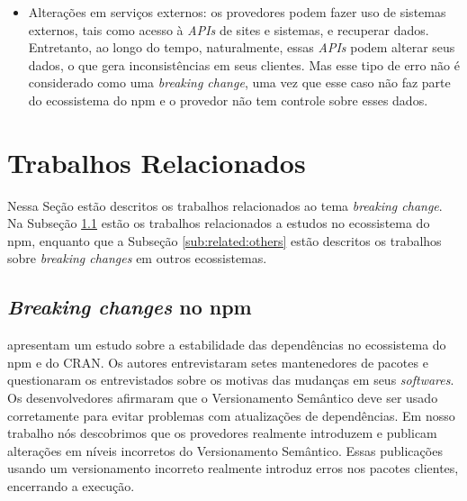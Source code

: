 \begin{itemize}
    \item Alterações em serviços externos: os provedores podem fazer uso de sistemas externos, tais como acesso à \textit{APIs} de sites e sistemas, e recuperar dados. Entretanto, ao longo do tempo, naturalmente, essas \textit{APIs} podem alterar seus dados, o que gera inconsistências em seus clientes. Mas esse tipo de erro não é considerado como uma \textit{breaking change}, uma vez que esse caso não faz parte do ecossistema do \textsf{npm} e o provedor não tem controle sobre esses dados.
\end{itemize}{}

\section{Trabalhos Relacionados}
\label{sec:related_works}
Nessa Seção estão descritos os trabalhos relacionados ao tema \textit{breaking change}. Na Subseção \ref{sub:related:npm} estão os trabalhos relacionados a estudos no ecossistema do \textsf{npm}, enquanto que a Subseção \ref{sub:related:others} estão descritos os trabalhos sobre \textit{breaking changes} em outros ecossistemas.

\subsection{\textit{Breaking changes} no \textsf{npm}}
\label{sub:related:npm}

 apresentam um estudo sobre a estabilidade das dependências no ecossistema do \textsf{npm} e do \textsf{CRAN}. Os autores entrevistaram setes mantenedores de pacotes e questionaram os entrevistados sobre os motivas das mudanças em seus \textit{softwares}. Os desenvolvedores afirmaram que o Versionamento Semântico deve ser usado corretamente para evitar problemas com atualizações de dependências. Em nosso trabalho nós descobrimos que os provedores realmente introduzem e publicam alterações em níveis incorretos do Versionamento Semântico. Essas publicações usando um versionamento incorreto realmente introduz erros nos pacotes clientes, encerrando a execução.

